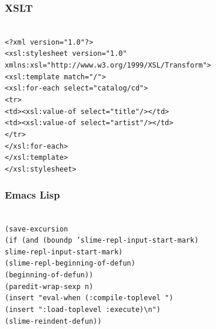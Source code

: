\documentclass{beamer}
\begin{document}
\newcommand{\cxsl}[1]{\alert{xsl:#1}}
\newcommand{\cattr}[2]{\color{orange}#1\color{black}=\color{gray}"#2"\color{black}}
\begin{frame}
    \frametitle{XSLT}
    \texttt{
        \\
        <?xml \cattr{version}{1.0}?> \\
        <\cxsl{stylesheet} \cattr{version}{1.0} \\
        \quad\quad \cattr{xmlns:xsl}{http://www.w3.org/1999/XSL/Transform}> \\
        \quad<\cxsl{template} \cattr{match}{/}> \\
        \quad\quad<\cxsl{for-each} \cattr{select}{catalog/cd}> \\
        \quad\quad\quad\color{blue}<tr> \\
        \quad\quad\quad\quad<td>\color{black}<\cxsl{value-of} \cattr{select}{title}/>\color{blue}</td> \\
        \quad\quad\quad\quad<td>\color{black}<\cxsl{value-of} \cattr{select}{artist}/>\color{blue}</td> \\
        \quad\quad\quad</tr>\color{black} \\
        \quad\quad</\cxsl{for-each}> \\
        \quad</\cxsl{template}> \\
        </\cxsl{stylesheet}>
    }
\end{frame}

\begin{frame}
    \frametitle{Emacs Lisp}
    \texttt{
        \\
        (save-excursion \\
        \quad(if (and (boundp 'slime-repl-input-start-mark) \\
        \quad\quad\quad slime-repl-input-start-mark) \\
        \quad\quad(slime-repl-beginning-of-defun) \\
        \quad\quad(beginning-of-defun)) \\
        \quad(\color{orange}paredit-wrap-sexp\color{black}\ n) \\
        \quad(\color{orange}insert \color{gray}"eval-when (:compile-toplevel "\color{black}) \\
        \quad(\color{orange}insert \color{gray}":load-toplevel :execute)\textbackslash n"\color{black}) \\
        \quad(\color{orange}slime-reindent-defun\color{black})) \\
    }
\end{frame}
\end{document}
